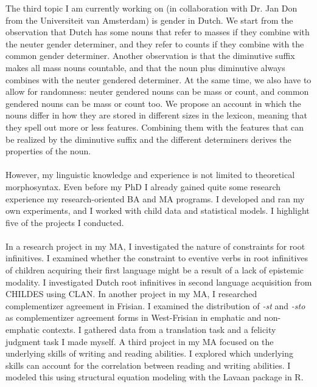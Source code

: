 \documentclass[12pt]{article}
\begin{document}
The third topic I am currently working on (in collaboration with Dr. Jan Don from the Universiteit van Amsterdam) is gender in Dutch. We start from the observation that Dutch has some nouns that refer to masses if they combine with the neuter gender determiner, and they refer to counts if they combine with the common gender determiner. Another observation is that the diminutive suffix makes all mass nouns countable, and that the noun plus diminutive always combines with the neuter gendered determiner. At the same time, we also have to allow for randomness: neuter gendered nouns can be mass or count, and common gendered nouns can be mass or count too. We propose an account in which the nouns differ in how they are stored in different sizes in the lexicon, meaning that they spell out more or less features. Combining them with the features that can be realized by the diminutive suffix and the different determiners derives the properties of the noun.\\

\phantom{x}\\

However, my linguistic knowledge and experience is not limited to theoretical morphosyntax. Even before my PhD I already gained quite some research experience my research-oriented BA and MA programs. I developed and ran my own experiments, and I worked with child data and statistical models. I highlight five of the projects I conducted.\\

\phantom{x}\\

In a research project in my MA, I investigated the nature of constraints for root infinitives. I examined whether the constraint to eventive verbs in root infinitives of children acquiring their first language might be a result of a lack of epistemic modality. I investigated Dutch root infinitives in second language acquisition from CHILDES using CLAN. In another project in my MA, I researched complementizer agreement in Frisian. I examined the distribution of \emph{-st} and \emph{-sto} as complementizer agreement forms in West-Frisian in emphatic and non-emphatic contexts. I gathered data from a translation task and a felicity judgment task I made myself. A third project in my MA focused on the underlying skills of writing and reading abilities. I explored which underlying skills can account for the correlation between reading and writing abilities. I modeled this using structural equation modeling with the Lavaan package in R.\\
\end{document}
